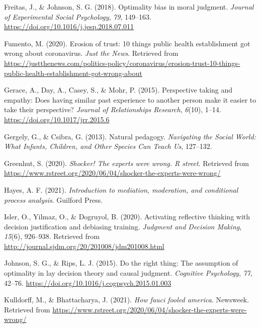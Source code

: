 \documentclass[
  man, donotrepeattitle,floatsintext]{apa6}
\newlength{\cslhangindent}
\newlength{\cslentryspacingunit} %
\newenvironment{CSLReferences}[2] %
 {%
  \setlength{\parindent}{0pt}
  \ifodd #1
  \let\oldpar\par
  \def\par{\hangindent=\cslhangindent\oldpar}
  \fi
  \setlength{\parskip}{#2\cslentryspacingunit}
 }%
 {}
\begin{document}
\begin{CSLReferences}{1}{0}
\leavevmode{}%
Freitas, J., \& Johnson, S. G. (2018). Optimality bias in moral judgment. \emph{Journal of Experimental Social Psychology}, \emph{79}, 149--163. \url{https://doi.org/10.1016/j.jesp.2018.07.011}

\leavevmode{}%
Fumento, M. (2020). Erosion of trust: 10 things public health establishment got wrong about coronavirus. \emph{Just the News}. Retrieved from \url{https://justthenews.com/politics-policy/coronavirus/erosion-trust-10-things-public-health-establishment-got-wrong-about}

\leavevmode{}%
Gerace, A., Day, A., Casey, S., \& Mohr, P. (2015). Perspective taking and empathy: Does having similar past experience to another person make it easier to take their perspective? \emph{Journal of Relationships Research}, \emph{6}(10), 1--14. \url{https://doi.org/10.1017/jrr.2015.6}

\leavevmode{}%
Gergely, G., \& Csibra, G. (2013). Natural pedagogy. \emph{Navigating the Social World: What Infants, Children, and Other Species Can Teach Us}, 127--132.

\leavevmode{}%
Greenhut, S. (2020). \emph{Shocker! The experts were wrong. R street}. Retrieved from \url{https://www.rstreet.org/2020/06/04/shocker-the-experts-were-wrong/}

\leavevmode{}%
Hayes, A. F. (2021). \emph{Introduction to mediation, moderation, and conditional process analysis}. Guilford Press.

\leavevmode{}%
Isler, O., Yilmaz, O., \& Dogruyol, B. (2020). Activating reflective thinking with decision justification and debiasing training. \emph{Judgment and Decision Making}, \emph{15}(6), 926--938. Retrieved from \url{http://journal.sjdm.org/20/201008/jdm201008.html}

\leavevmode{}%
Johnson, S. G., \& Rips, L. J. (2015). Do the right thing: The assumption of optimality in lay decision theory and causal judgment. \emph{Cognitive Psychology}, \emph{77}, 42--76. \url{https://doi.org/10.1016/j.cogpsych.2015.01.003}

\leavevmode{}%
Kulldorff, M., \& Bhattacharya, J. (2021). \emph{How fauci fooled america}. Newsweek. Retrieved from \url{https://www.rstreet.org/2020/06/04/shocker-the-experts-were-wrong/}


\end{CSLReferences}
\end{document}
